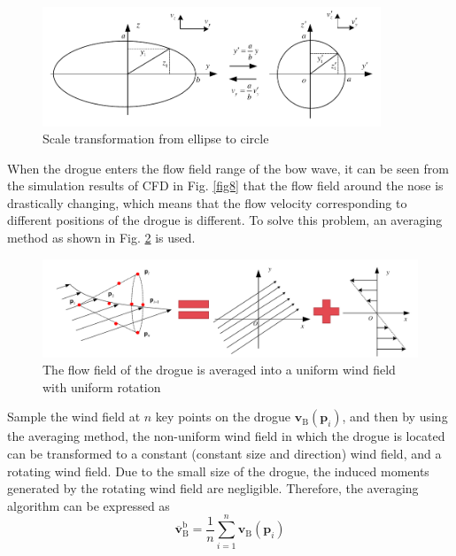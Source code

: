 \begin{figure}[th]
	\centering
	\includegraphics[width=0.9\textwidth]{Figures/Figs_Ch4/fig10.pdf}
	\caption{Scale transformation from ellipse to circle}\label{fig10}
\end{figure}

When the drogue enters the flow field range of the bow wave, it can be seen from the simulation results of CFD in Fig. \ref{fig8} that the flow field around the nose is drastically changing, which means that the flow velocity corresponding to different positions of the drogue is different. To solve this problem, an averaging method as shown in Fig. \ref{fig11} is used\cite{dogan2008flight}.
\begin{figure}[th]
	\centering
	\includegraphics[width=1.0\textwidth]{Figures/Figs_Ch4/fig11.pdf}
	\caption{The flow field of the drogue is averaged into a uniform wind field with uniform rotation}\label{fig11}
\end{figure}

Sample the wind field at $n$ key points on the drogue  $\mathbf{v}_\mathrm{B}\left({{\mathbf{p}_i}} \right)$, and then by using the averaging method, the non-uniform wind field in which the drogue is located can be transformed to a constant (constant size and direction) wind field, and a rotating wind field. Due to the small size of the drogue, the induced moments generated by the rotating wind field are negligible. Therefore, the averaging algorithm can be expressed as
\begin{equation}\label{eq40}
\overline{\mathbf{v}}_{\mathrm{B}}^{\mathrm{b}}=\frac{1}{n} \sum_{i=1}^n \mathbf{v}_{\mathrm{B}}\left(\mathbf{p}_i\right)
\end{equation}

